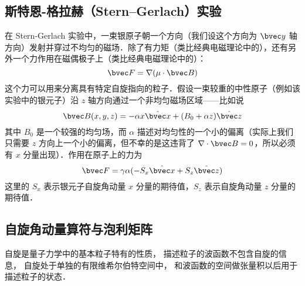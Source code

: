 
\begin{issues}
\issueDraft
\end{issues}


\subsection{斯特恩-格拉赫（Stern–Gerlach）实验}

在 Stern-Gerlach 实验中，一束银原子朝一个方向（我们设这个方向为 $\bvec y$ 轴方向）发射并穿过不均匀的磁场．除了有力矩（类比经典电磁理论中的），还有另外一个力作用在磁偶极子上（类比经典电磁理论中的）：
\begin{equation}\label{Spin_eq1}
\bvec F=\nabla(\mu\cdot \bvec B)
\end{equation}
这个力可以用来分离具有特定自旋指向的粒子．假设一束较重的中性原子（例如该实验中的银元子）沿 $z$ 轴方向通过一个非均匀磁场区域——比如说
\begin{equation}\label{Spin_eq2}
\bvec B(x,y,z)=-\alpha x \hat{\bvec x}+(B_0+\alpha z)\hat {\bvec z}
\end{equation}
其中 $B_0$ 是一个较强的均匀场，而 $\alpha$ 描述对均匀性的一个小的偏离（实际上我们只需要 $z$ 方向上一个小的偏离，但不幸的是这违背了 $\nabla\cdot \bvec B=0$，所以必须有 $x$ 分量出现）．作用在原子上的力为
\begin{equation}
\bvec F=\gamma \alpha (-S_x \hat{\bvec x}+S_z\hat{\bvec z})
\end{equation}
这里的 $S_x$ 表示银元子自旋角动量 $x$ 分量的期待值，$S_z$ 表示自旋角动量 $z$ 分量的期待值．
\subsection{自旋角动量算符与泡利矩阵}

自旋是量子力学中的基本粒子特有的性质， 描述粒子的波函数不包含自旋的信息， 自旋处于单独的有限维希尔伯特空间中， 和波函数的空间做张量积以后用于描述粒子的状态．

